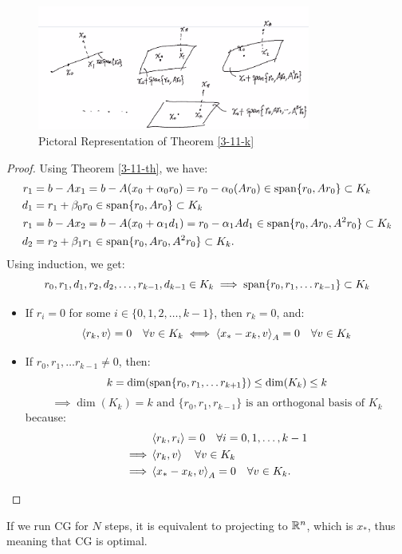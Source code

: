 \documentclass[../main/main.tex]{subfiles}
\begin{document}
\begin{figure}[htpb]
  \centering
  \includegraphics[width=0.8\textwidth]{../images/3-11-k.png}
  \caption{Pictoral Representation of Theorem \ref{3-11-k}}
\end{figure}
\begin{proof}
  Using Theorem \ref{3-11-th}, we have:
  \begin{align*}
    r_{1} &= b-Ax_{1} = b-A(x_{0}+\alpha_{0}r_{0}) =r_{0} - \alpha_{0}  (Ar_{0}) \in \operatorname{span} \{r_{0}, Ar_{0}\}\subset K_{k} \\
    d_{1} &= r_{1} + \beta _{0}r_{0} \in \operatorname{span} \{r_{0}, A r_{0}\}\subset K_{k} \\
    r_{1} &= b-Ax_{2} = b-A(x_{0}+\alpha_{1}d_{1}) =r_{0} - \alpha_{1}  Ad_{1} \in \operatorname{span} \{r_{0}, Ar_{0}, A^2 r_{0}\}\subset K_{k} \\
    d_{2} &= r_{2} + \beta _{1}r_{1} \in \operatorname{span} \{r_{0}, A r_{0}, A^2r_{0}\}\subset K_{k}
    .\end{align*}
  Using induction, we get: \[
    r_{0}, r_{1}, d_{1}, r_{2}, d_{2}, \ldots , r_{k-1}, d_{k-1} \in K_{k} \implies  \operatorname{span} \{r_{0},r_{1}, \ldots r_{k-1}\}\subset K_{k}
  \]
  \begin{itemize}
    \item If $r_{i} =0$ for some $i\in \{0,1,2, \ldots  ,k-1\}$, then $r_{k}=0$, and: \[
          \left\langle{r_{k}},{v}\right\rangle=0 \quad  \forall  v \in K_{k} \iff  \left\langle{x_{*}-x_{k}},{v}\right\rangle_{A} = 0 \quad  \forall  v \in  K_{k}
          \]
    \item If $r_{0}, r_{1}, \ldots  r_{k-1} \neq 0$, then: \[
          k = \dim (\operatorname{span} \{r_{0},r_{1}, \ldots  r_{k+1}\}) \leq  \dim (K_{k}) \leq  k
          \]
          \[
          \implies \dim (K_{k}) = k \text{ and } \{r_{0},r_{1},r_{k-1}\} \text{ is an orthogonal basis of } K_{k}
          \] because:
          \begin{align*}
            &\left\langle{r_{k}},{r_{i}}\right\rangle = 0 \quad \forall i = 0, 1, \ldots , k-1\\
            \implies  & \left\langle{r_{k}},{v}\right\rangle \quad  \forall v \in K_{k} \\
            \implies  & \left\langle{x_{*}-x_{k}},{v}\right\rangle_{A} = 0 \quad \forall  v \in K_{k}
            .\end{align*}
  \end{itemize}
\end{proof}
\begin{corollary}
If we run CG for $N$ steps, it is equivalent to projecting to $\mathbb{R} ^{n}$, which is $x_{*}$, thus meaning that CG is optimal.
\end{corollary}
\end{document}
